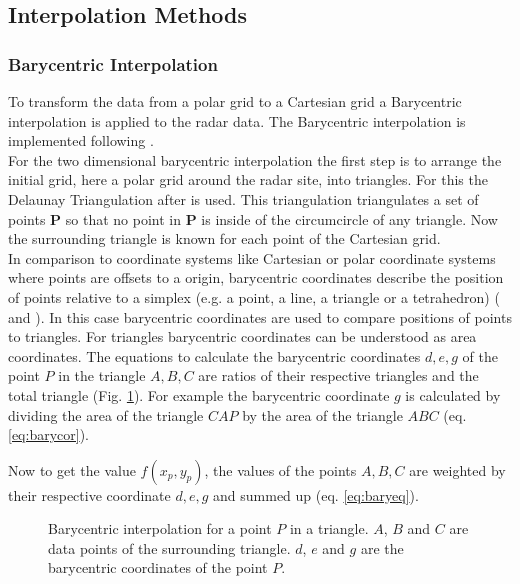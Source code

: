 \documentclass[11pt,twoside,a4paper,fleqn,x11names]{report}
\numberwithin{equation}{chapter}
\numberwithin{figure}{chapter}
\numberwithin{table}{chapter}
\begin{document}
\subsection{Interpolation Methods}
\subsubsection{Barycentric Interpolation}
To transform the data from a polar grid to a Cartesian grid a Barycentric interpolation is applied to the radar data. The Barycentric interpolation is implemented following \cite{bary}. \\
For the two dimensional barycentric interpolation the first step is to arrange the initial grid, here a polar grid around the radar site, into triangles. For this the Delaunay Triangulation after \cite{delaunay} is used. This triangulation triangulates a set of points \textbf{P} so that no point in \textbf{P} is inside of the circumcircle of any triangle. Now the surrounding triangle is known for each point of the Cartesian grid.\\
In comparison to coordinate systems like Cartesian or polar coordinate systems where points are offsets to a origin, barycentric coordinates describe the position of points relative to a simplex (e.g. a point, a line, a triangle or a tetrahedron) (\citealp{bary} and \citealp{baryBerrut}). In this case barycentric coordinates are used to compare positions of points to triangles. For triangles barycentric coordinates can be understood as area coordinates. The equations to calculate the barycentric coordinates $d,e,g$ of the point $P$ in the triangle $A,B,C$ are ratios of their respective triangles and the total triangle (Fig. \ref{fig:bary}). For example the barycentric coordinate $g$ is calculated by dividing the area of the triangle $CAP$ by the area of the triangle $ABC$ (eq. \ref{eq:barycor}).

Now to get the value $f(x_p,y_p)$, the values of the points $A,B,C$ are weighted by their respective coordinate $d,e,g$ and summed up (eq. \ref{eq:baryeq}).
\begin{figure}[!htbp]
	\centering
	\caption{Barycentric interpolation for a point $P$ in a triangle. $A$, $B$ and $C$ are data points of the surrounding triangle. $d$, $e$ and $g$ are the barycentric coordinates of the point $P$.}
	\label{fig:bary}
\end{figure}
\end{document}
